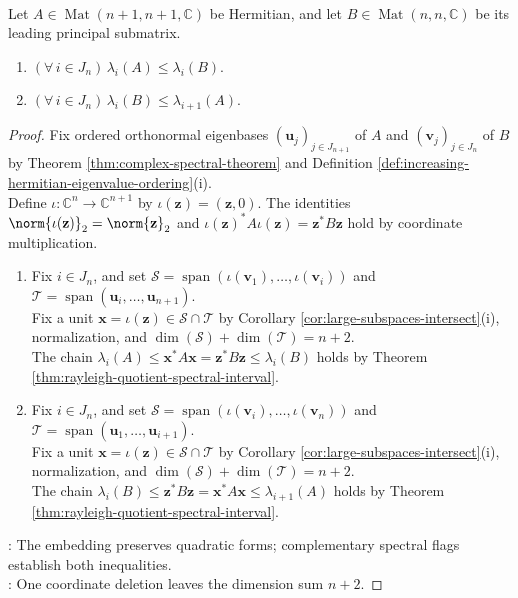 \begin{theorem} \label{thm:cauchy-principal-submatrix-interlacing} \\
Let $A\in\operatorname{Mat}(n+1,n+1,\mathbb{C})$ be Hermitian, and let $B\in\operatorname{Mat}(n,n,\mathbb{C})$ be its leading principal submatrix.
\begin{enumerate}[label=(\roman*)]
\setlength{\itemsep}{0pt}
\item $(\forall\,i\in J_n)\,\lambda_i(A)\leq\lambda_i(B)$.
\item $(\forall\,i\in J_n)\,\lambda_i(B)\leq\lambda_{i+1}(A)$.
\end{enumerate}
\begin{proof}
Fix ordered orthonormal eigenbases $(\mathbf{u}_j)_{j\in J_{n+1}}$ of $A$ and $(\mathbf{v}_j)_{j\in J_n}$ of $B$ by Theorem \ref{thm:complex-spectral-theorem} and Definition \ref{def:increasing-hermitian-eigenvalue-ordering}(i).\\
Define $\iota:\mathbb{C}^n\to\mathbb{C}^{n+1}$ by $\iota(\mathbf{z})=(\mathbf{z},0)$. The identities $\norm{\iota(\mathbf{z})}_2=\norm{\mathbf{z}}_2$ and $\iota(\mathbf{z})^*A\iota(\mathbf{z})=\mathbf{z}^*B\mathbf{z}$ hold by coordinate multiplication.
\begin{enumerate}[label=(\roman*)]
\setlength{\itemsep}{0pt}
\item Fix $i\in J_n$, and set $\mathcal{S}=\operatorname{span}(\iota(\mathbf{v}_1),\ldots,\iota(\mathbf{v}_i))$ and $\mathcal{T}=\operatorname{span}(\mathbf{u}_i,\ldots,\mathbf{u}_{n+1})$.\\
Fix a unit $\mathbf{x}=\iota(\mathbf{z})\in\mathcal{S}\cap\mathcal{T}$ by Corollary \ref{cor:large-subspaces-intersect}(i), normalization, and $\dim(\mathcal{S})+\dim(\mathcal{T})=n+2$.\\
The chain $\lambda_i(A)\leq\mathbf{x}^*A\mathbf{x}=\mathbf{z}^*B\mathbf{z}\leq\lambda_i(B)$ holds by Theorem \ref{thm:rayleigh-quotient-spectral-interval}.
\item Fix $i\in J_n$, and set $\mathcal{S}=\operatorname{span}(\iota(\mathbf{v}_i),\ldots,\iota(\mathbf{v}_n))$ and $\mathcal{T}=\operatorname{span}(\mathbf{u}_1,\ldots,\mathbf{u}_{i+1})$.\\
Fix a unit $\mathbf{x}=\iota(\mathbf{z})\in\mathcal{S}\cap\mathcal{T}$ by Corollary \ref{cor:large-subspaces-intersect}(i), normalization, and $\dim(\mathcal{S})+\dim(\mathcal{T})=n+2$.\\
The chain $\lambda_i(B)\leq\mathbf{z}^*B\mathbf{z}=\mathbf{x}^*A\mathbf{x}\leq\lambda_{i+1}(A)$ holds by Theorem \ref{thm:rayleigh-quotient-spectral-interval}.
\end{enumerate}
: The embedding preserves quadratic forms; complementary spectral flags establish both inequalities.\\
: One coordinate deletion leaves the dimension sum $n+2$.
\end{proof}
\end{theorem}

